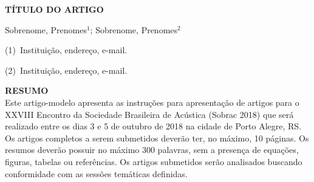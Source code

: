 \documentclass[12pt, a4paper, oneside, onecolumn] {article}%
\newcommand{\brev}[1]{#1} %
\begin{document}
\begin{center} 
\Cabecalho
{\fontsize{14}{18}\selectfont \bfseries \uppercase{
Título do artigo
}\\[18pt]\par} {\fontsize{12}{15}\selectfont 
\brev{Sobrenome, Prenomes$^{1}$; Sobrenome, Prenomes$^{2}$}
\\[14pt]\par}
\brev{
{\fontsize{10}{13} \selectfont (1)\, Instituição, endereço, e-mail. \\[2pt]\par}
{\fontsize{10}{13} \selectfont (2)\, Instituição, endereço, e-mail. \\[2pt]\par}
}
\end{center} \vspace{16pt}
{\fontsize{12}{14} \selectfont \bfseries \uppercase{Resumo}}\\[6pt]
{\fontsize{11}{14.5} \selectfont 
Este artigo-modelo apresenta as instruções para apresentação de artigos para o XXVIII Encontro da Sociedade Brasileira de Acústica (Sobrac 2018) que será realizado entre os dias 3 e 5 de outubro de 2018 na cidade de Porto Alegre, RS. Os artigos completos a serem submetidos deverão ter, no máximo, 10 páginas. Os resumos deverão possuir no máximo 300 palavras, sem a presença de equações, figuras, tabelas ou referências. Os artigos submetidos serão analisados buscando conformidade com as sessões temáticas definidas. 
}\\[6pt]
\end{document}
